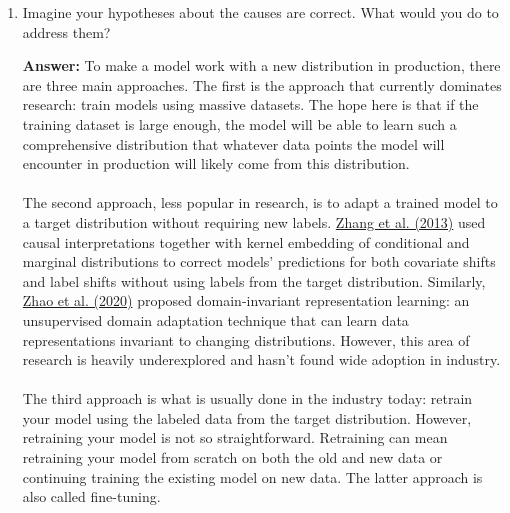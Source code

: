 \documentclass{article}
\newenvironment{QandA}{\begin{enumerate}[label=\arabic*.]}{\end{enumerate}}
\newenvironment{InnerQandA}{\begin{enumerate}[label=\roman*.]}{\end{enumerate}}
\newenvironment{answer}{\par\normalfont \textbf{Answer:}}{}
\begin{document}
\begin{QandA}
\begin{InnerQandA}
\begin{answer}
            When dealing with temporal shifts, the time scale window of the data we look at affects the shifts we can detect. If your data has a weekly cycle, then a time scale of less than a week won’t detect the cycle. Therefore, by setting the time window too small, your detection technique can produce a false alarm simply due to the seasonality inherent to the data. \\\\
            When computing running statistics over time, it’s important to differentiate between cumulative and sliding statistics. Sliding statistics are computed within a single time scale window, e.g. an hour. Cumulative statistics are continually updated with more data. This means for each beginning of a time scale window, the sliding accuracy is reset, whereas the cumulative sliding accuracy is not. Because cumulative statistics contain information from previous time windows, they might obscure what happens in a specific time window. 
        \end{answer}

        \item Imagine your hypotheses about the causes are correct. What would you do to address them?
        \begin{answer}
            To make a model work with a new distribution in production, there are three main approaches. The first is the approach that currently dominates research: train models using massive datasets. The hope here is that if the training dataset is large enough, the model will be able to learn such a comprehensive distribution that whatever data points the model will encounter in production will likely come from this distribution. \\\\
            The second approach, less popular in research, is to adapt a trained model to a target distribution without requiring new labels. \href{http://proceedings.mlr.press/v28/zhang13d.pdf}{Zhang et al. (2013)} used causal interpretations together with kernel embedding of conditional and marginal distributions to correct models’ predictions for both covariate shifts and label shifts without using labels from the target distribution. Similarly, \href{http://proceedings.mlr.press/v97/zhao19a.html}{Zhao et al. (2020)} proposed domain-invariant representation learning: an unsupervised domain adaptation technique that can learn data representations invariant to changing distributions. However, this area of research is heavily underexplored and hasn’t found wide adoption in industry. \\\\
            The third approach is what is usually done in the industry today: retrain your model using the labeled data from the target distribution. However, retraining your model is not so straightforward. Retraining can mean retraining your model from scratch on both the old and new data or continuing training the existing model on new data. The latter approach is also called fine-tuning.
        \end{answer}


\end{InnerQandA}
\end{QandA}
\end{document}
